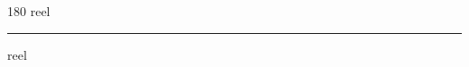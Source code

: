 
\begin{frame}
\begin{center}
\begin{turn}{180}
{\fontsize{2.5cm}{1em}\selectfont reel}
\end{turn}
\vspace{1em}\par  
\hrule
\vspace{1em}\par  
{\fontsize{2.5cm}{1em}\selectfont reel}
\end{center}
\end{frame}
